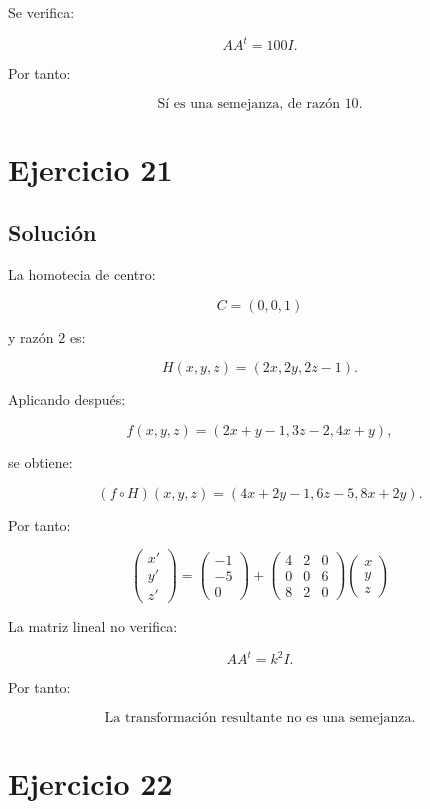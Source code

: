 \documentclass[11pt,a4paper]{article}
\begin{document}
Se verifica:

\[
AA^t=100I.
\]

Por tanto:

\[
\boxed{
\text{Sí es una semejanza, de razón }10.
}
\]

\section{Ejercicio 21}
\subsection{Solución}

La homotecia de centro:

\[
C=(0,0,1)
\]

y razón \(2\) es:

\[
H(x,y,z)
=
(2x,2y,2z-1).
\]

Aplicando después:

\[
f(x,y,z)
=
(2x+y-1,3z-2,4x+y),
\]

se obtiene:

\[
(f\circ H)(x,y,z)
=
(4x+2y-1,6z-5,8x+2y).
\]

Por tanto:

\[
\boxed{
\begin{pmatrix}
x'\\
y'\\
z'
\end{pmatrix}
=
\begin{pmatrix}
-1\\
-5\\
0
\end{pmatrix}
+
\begin{pmatrix}
4&2&0\\
0&0&6\\
8&2&0
\end{pmatrix}
\begin{pmatrix}
x\\
y\\
z
\end{pmatrix}
}
\]

La matriz lineal no verifica:

\[
AA^t=k^2I.
\]

Por tanto:

\[
\boxed{
\text{La transformación resultante no es una semejanza.}
}
\]

\section{Ejercicio 22}
\end{document}
